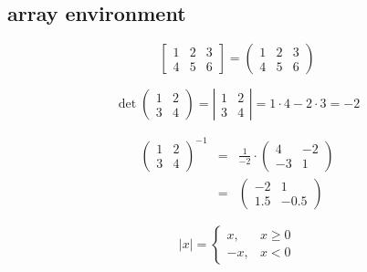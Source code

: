 \documentclass{article}
\begin{document}
\subsection{array environment}

\begin{equation*}
	\left[ %
	\begin{array}{ccc} %
		1 & 2 & 3\\
		4 & 5 & 6
	\end{array}
	\right] %
	=
	\left( %
	\begin{array}{ccc}
		1 & 2 & 3\\
		4 & 5 & 6
	\end{array}
	\right) %
\end{equation*}


\begin{equation}
	\det 
	\left(
	\begin{array}{cc}
		1 & 2\\
		3 &4
	\end{array}
	\right)
	=
	\left|
	\begin{array}{cc}
		1 & 2\\
		3 &4
	\end{array}
	\right|
	=1\cdot 4-2\cdot 3=-2
\end{equation}

\begin{eqnarray}
	\left(\begin{array}{cc}
		1 & 2\\
		3 &4
	\end{array}\right)^{-1}
	&=&
	\frac{1}{-2}\cdot
	\left(
	\begin{array}{rr}
		4 & -2\\
		-3 &1
	\end{array}\right) \\[2mm]
	&=&
	\left(
	\begin{array}{rr}
		-2 & 1\\
		1.5 &-0.5
	\end{array}\right) \nonumber
\end{eqnarray}


\begin{equation}
	|x|= 
	\left\{ %
	\begin{array}{rc}
		x,& x\geq 0\\
		-x, & x<0
	\end{array}
	\right. %
\end{equation}
\end{document}
